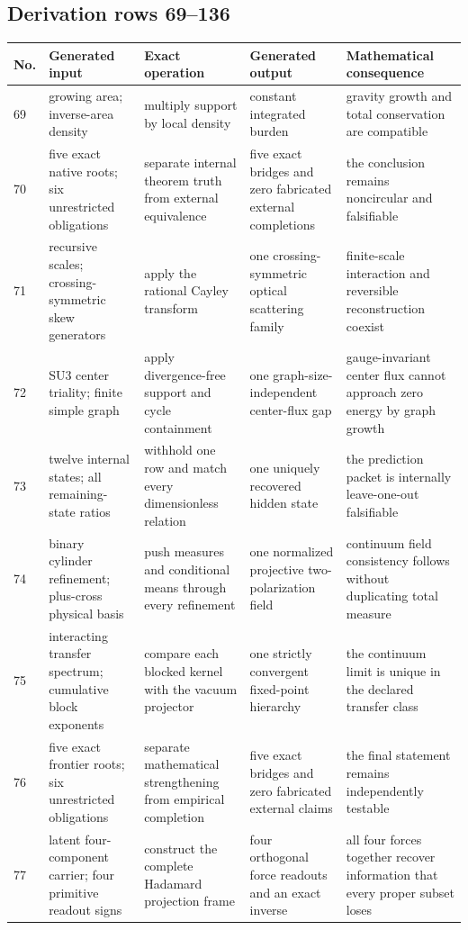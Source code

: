 \documentclass[11pt]{article}
\numberwithin{equation}{section}
\theoremstyle{remark}
\begin{document}
\begin{landscape}
\subsection{Derivation rows 69--136}
\begin{longtable}{p{0.65cm}p{3.5cm}p{4.0cm}p{4.0cm}p{4.6cm}}
\toprule No.&Generated input&Exact operation&Generated output&Mathematical consequence\\\midrule\endhead
69&growing area; inverse-area density&multiply support by local density&constant integrated burden&gravity growth and total conservation are compatible\\
70&five exact native roots; six unrestricted obligations&separate internal theorem truth from external equivalence&five exact bridges and zero fabricated external completions&the conclusion remains noncircular and falsifiable\\
71&recursive scales; crossing-symmetric skew generators&apply the rational Cayley transform&one crossing-symmetric optical scattering family&finite-scale interaction and reversible reconstruction coexist\\
72&SU3 center triality; finite simple graph&apply divergence-free support and cycle containment&one graph-size-independent center-flux gap&gauge-invariant center flux cannot approach zero energy by graph growth\\
73&twelve internal states; all remaining-state ratios&withhold one row and match every dimensionless relation&one uniquely recovered hidden state&the prediction packet is internally leave-one-out falsifiable\\
74&binary cylinder refinement; plus-cross physical basis&push measures and conditional means through every refinement&one normalized projective two-polarization field&continuum field consistency follows without duplicating total measure\\
75&interacting transfer spectrum; cumulative block exponents&compare each blocked kernel with the vacuum projector&one strictly convergent fixed-point hierarchy&the continuum limit is unique in the declared transfer class\\
76&five exact frontier roots; six unrestricted obligations&separate mathematical strengthening from empirical completion&five exact bridges and zero fabricated external claims&the final statement remains independently testable\\
77&latent four-component carrier; four primitive readout signs&construct the complete Hadamard projection frame&four orthogonal force readouts and an exact inverse&all four forces together recover information that every proper subset loses\\

\end{longtable}
\end{landscape}
\end{document}
